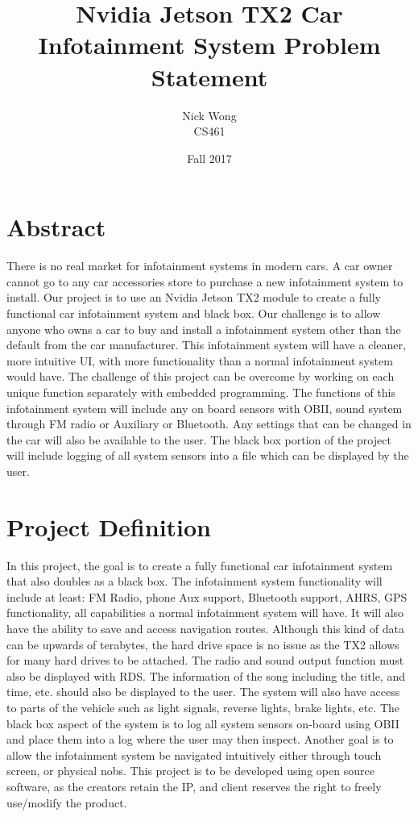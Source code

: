 \documentclass{article}
\title{Nvidia Jetson TX2 Car Infotainment System Problem Statement}
\author{
Nick Wong\\CS461
}
\date{Fall 2017}
\begin{document}
  \maketitle

  \section{Abstract}
There is no real market for infotainment systems in modern cars. A car owner cannot go to any car accessories store to purchase a new infotainment system to install. Our project is to use an Nvidia Jetson TX2 module to create a fully functional car infotainment system and black box. Our challenge is to allow anyone who owns a car to buy and install a infotainment system other than the default from the car manufacturer. This infotainment system will have a cleaner, more intuitive UI, with more functionality than a normal infotainment system would have.
The challenge of this project can be overcome by working on each unique function separately with embedded programming. The functions of this infotainment system will include any on board sensors with OBII, sound system through FM radio or Auxiliary or Bluetooth. Any settings that can be changed in the car will also be available to the user. The black box portion of the project will include logging of all system sensors into a file which can be displayed by the user. 

\newpage
\section{Project Definition}
In this project, the goal is to create a fully functional car infotainment system that also doubles as a black box. The infotainment system functionality will include at least: FM Radio, phone Aux support, Bluetooth support, AHRS, GPS functionality, all capabilities a normal infotainment system will have. It will also have the ability to save and access navigation routes. Although this kind of data can be upwards of terabytes, the hard drive space is no issue as the TX2 allows for many hard drives to be attached. The radio and sound output function must also be displayed with RDS. The information of the song including the title, and time, etc. should also be displayed to the user. The system will also have access to parts of the vehicle such as light signals, reverse lights, brake lights, etc. The black box aspect of the system is to log all system sensors on-board using OBII and place them into a log where the user may then inspect. Another goal is to allow the infotainment system be navigated intuitively either through touch screen, or physical nobs. This project is to be developed using open source software, as the creators retain the IP, and client reserves the right to freely use/modify the product.  
\end{document}
